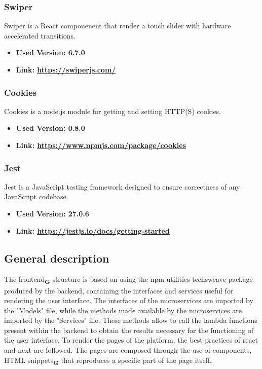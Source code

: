 \subsubsection{Swiper}
Swiper is a React componenent that render a touch slider with hardware accelerated transitions.
\begin{itemize}
  \item \textbf{Used Version: 6.7.0}
  \item \textbf{Link: \url{https://swiperjs.com/}}
\end{itemize}
\subsubsection{Cookies}
Cookies is a node.js module for getting and setting HTTP(S) cookies.
\begin{itemize}
  \item \textbf{Used Version: 0.8.0}
  \item \textbf{Link: \url{https://www.npmjs.com/package/cookies}}
\end{itemize}
\subsubsection{Jest}
Jest is a JavaScript testing framework designed to ensure correctness of any JavaScript codebase.
\begin{itemize}
  \item \textbf{Used Version: 27.0.6}
  \item \textbf{Link: \url{https://jestjs.io/docs/getting-started}}
\end{itemize}
\subsection{General description}
The frontend\textsubscript{\textbf{G}} structure is based on using the npm utilities-techsweave package produced by the backend, containing the interfaces and services useful for rendering the user interface. The interfaces of the microservices are imported by the "Models" file, while the methods made available by the microservices are imported by the "Services" file. These methods allow to call the lambda functions present within the backend to obtain the results necessary for the functioning of the user interface. To render the pages of the platform, the best practices of react and next are followed. The pages are composed through the use of components, HTML snippets\textsubscript{\textbf{G}} that reproduces a specific part of the page itself.
